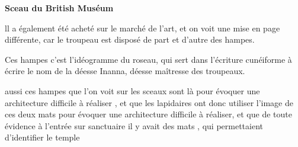 \documentclass[a4paper]{article}
\begin{document}
\bigskip


\bigskip

{
\textbf{Sceau du British Muséum}}


\bigskip


\bigskip


\bigskip


\bigskip

{
ll a également été acheté sur le marché de l'art, et on voit une mise en
page différente, car le troupeau est disposé de part et d'autre des
hampes.}

{
Ces hampes c'est l'idéogramme du roseau, qui sert dans l'écriture
cunéiforme à écrire le nom de la déesse Inanna, déesse maîtresse des
troupeaux.}

{
aussi ces hampes que l'on voit sur les sceaux sont là pour évoquer une
architecture difficile à réaliser , et que les lapidaires ont donc
utiliser l'image de ces deux mats pour évoquer une architecture
difficile à réaliser, et que de toute évidence à l'entrée sur
sanctuaire il y avait des mats , qui permettaient d'identifier le
temple}


\bigskip


\bigskip


\bigskip


\bigskip


\bigskip


\bigskip


\bigskip


\bigskip


\bigskip


\bigskip


\bigskip


\bigskip


\bigskip


\bigskip


\bigskip


\bigskip


\bigskip


\bigskip


\bigskip


\bigskip


\bigskip


\bigskip


\bigskip


\bigskip


\bigskip


\bigskip


\bigskip
\end{document}
